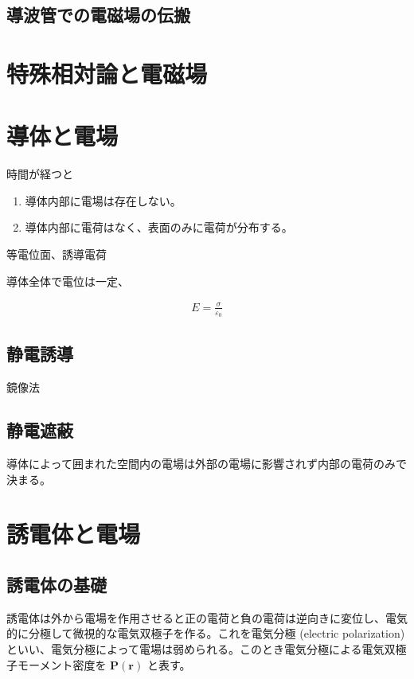 \documentclass[uplatex,dvipdfmx,a4paper,11pt]{jlreq}
\newcommand{\rr}{\bm{r}}
\theoremstyle{definition}
\begin{document}
\subsection{導波管での電磁場の伝搬}

\section{特殊相対論と電磁場}


\section{導体と電場}
\begin{definition}[導体]
  時間が経つと
  \begin{enumerate}
    \item 導体内部に電場は存在しない。
    \item 導体内部に電荷はなく、表面のみに電荷が分布する。
  \end{enumerate}
  等電位面、誘導電荷
\end{definition}
導体全体で電位は一定、

\begin{theorem}
  \begin{align}
    E = \frac{\sigma}{\varepsilon_0}
  \end{align}
\end{theorem}
\subsection{静電誘導}
\begin{proposition}[半無限導体と点電荷]
  鏡像法
\end{proposition}

\begin{proposition}[一様外部電場中の導体球]
\end{proposition}

\subsection{静電遮蔽}
導体によって囲まれた空間内の電場は外部の電場に影響されず内部の電荷のみで決まる。

\section{誘電体と電場}
\subsection{誘電体の基礎}
\begin{definition}[誘電体]
  誘電体は外から電場を作用させると正の電荷と負の電荷は逆向きに変位し、電気的に分極して微視的な電気双極子を作る。これを電気分極 (electric polarization) といい、電気分極によって電場は弱められる。このとき電気分極による電気双極子モーメント密度を $\bm{P}(\rr)$ と表す。
\end{definition}
\end{document}

